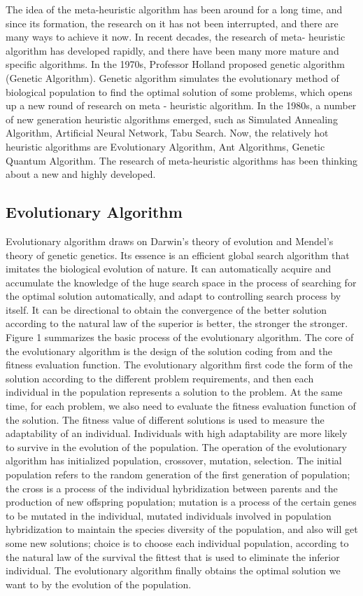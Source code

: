 The idea of the meta-heuristic algorithm has been around for a long time, and 
since its formation, the research on it has not been interrupted, and there 
are many ways to achieve it now. In recent decades, the research of meta-
heuristic algorithm has developed rapidly, and there have been many more 
mature and specific algorithms. In the 1970s, Professor Holland proposed 
genetic algorithm\cite{holland} (Genetic Algorithm). Genetic algorithm 
simulates the evolutionary method of biological population to find the 
optimal solution of some problems, which opens up a new round of research on 
meta - heuristic algorithm. In the 1980s, a number of new generation 
heuristic algorithms emerged, such as Simulated Annealing Algorithm, 
Artificial Neural Network, Tabu Search. Now, the relatively hot heuristic 
algorithms are Evolutionary Algorithm, Ant Algorithms, Genetic Quantum 
Algorithm. The research of meta-heuristic algorithms has been thinking about 
a new and highly developed\cite{harman}.

\subsection{Evolutionary Algorithm}
%
Evolutionary algorithm draws on Darwin's theory of evolution and Mendel's 
theory of genetic genetics. Its essence is an efficient global search 
algorithm that imitates the biological evolution of nature. It can 
automatically acquire and accumulate the knowledge of the huge search space 
in the process of searching for the optimal solution automatically, and adapt 
to controlling search process by itself. It can be directional to obtain the 
convergence of the better solution according to the natural law of the 
superior is better, the stronger the stronger\cite{deb}.
Figure 1 summarizes the basic process of the evolutionary algorithm. The core 
of the evolutionary algorithm is the design of the solution coding from and 
the fitness evaluation function. The evolutionary algorithm first code the 
form of the solution according to the different problem requirements, and 
then each individual in the population represents a solution to the problem. 
At the same time, for each problem, we also need to evaluate the fitness 
evaluation function of the solution. The fitness value of different solutions 
is used to measure the adaptability of an individual. Individuals with high 
adaptability are more likely to survive in the evolution of the population. 
The operation of the evolutionary algorithm has initialized population, 
crossover, mutation, selection. The initial population refers to the random 
generation of the first generation of population; the cross is a process of 
the individual hybridization between parents and the production of new 
offspring population; mutation is a process of the certain genes to be 
mutated in the individual, mutated individuals involved in population 
hybridization to maintain the species diversity of the population, and also 
will get some new solutions; choice is to choose each individual population, 
according to the natural law of the survival the fittest that is used to 
eliminate the inferior individual. The evolutionary algorithm finally obtains 
the optimal solution we want to by the evolution of the population.


